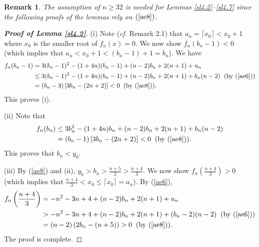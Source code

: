 \documentclass[12pt, A4paper, oneside]{article}
\theoremstyle{plain}
\newtheorem{rem}{Remark}[section]
\numberwithin{equation}{section}
\begin{document}
\begin{rem}
The assumption of $n\ge32$ is needed for Lemmas \ref{sl4.2}--\ref{sl4.7} since the following proofs of the lemmas rely on $(\ref{ae8})$.
\end{rem}


\begin{proof}[\bf Proof of Lemma \ref{sl4.2}]
(i) Note ({\it cf.} Remark 2.1) that  $a_n=\lceil x_0\rceil<x_0+1$ where $x_0$ is the smaller root of $f_n(x)=0$. We now  show $f_n(b_n-1)<0$ (which implies that  $a_n<x_0+1<(b_n-1)+1=b_n$). We have
\begin{align*}
f_n(b_n-1)&=3(b_n-1)^2-(1+4n)(b_n-1)+(n-2)b_n+2(n+1)+u_n\\
&\le3(b_n-1)^2-(1+4n)(b_n-1)+(n-2)b_n+2(n+1)+b_n(n-2)\;\;\mbox{(by (\ref{ae6}))}\\
&=(b_n-3)\left[3b_n-(2n+2)\right]<0\;\;\mbox{(by (\ref{ae8})).}
\end{align*}
This proves (i).

(ii) Note that
\begin{align*}
f_n(b_n)&\le3b_n^2-(1+4n)b_n+(n-2)b_n+2(n+1)+b_n(n-2)\\
&=(b_n-1)\left[3b_n-(2n+2)\right]<0\;\;\mbox{(by (\ref{ae8})).}
\end{align*}
This proves that $b_n<y_0$.

(iii) By (\ref{ae8}) and (ii), $y_0>b_n>\frac{n+5}{2}>\frac{n+4}{3}$. We now show  $f_n\left(\frac{n+4}{3}\right)>0$
(which implies that $\frac{n+4}{3}<x_0\le \lceil x_0 \rceil =a_n$). By (\ref{ae6}),
\begin{align*}
f_n\left(\frac{n+4}{3}\right)&=-n^2-3n+4+(n-2)b_n+2(n+1)+u_n\\
&>-n^2-3n+4+(n-2)b_n+2(n+1)+(b_n-2)(n-2)\;\;\mbox{(by (\ref{ae6}))}\\
&=(n-2)\left(2b_n-(n+5)\right)>0\;\;\mbox{(by (\ref{ae8})).}
\end{align*}
The proof is complete.
\end{proof}
\end{document}
